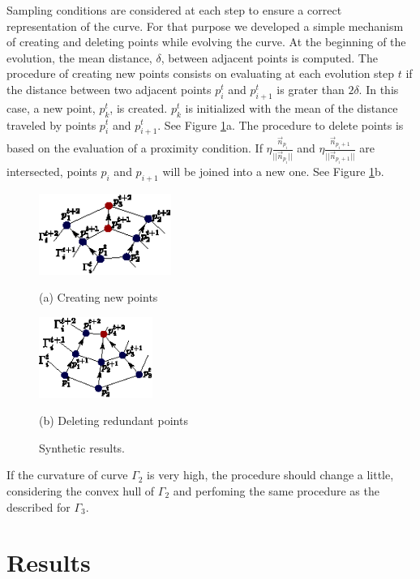 \documentclass{article}
\begin{document}
Sampling conditions are considered at each step to ensure a correct representation of the curve. For that purpose we developed a simple mechanism of creating and deleting points while evolving the curve. At the beginning of the evolution, the mean distance, $\delta$, between adjacent points is computed. The procedure of creating new points consists on evaluating at each evolution step $t$ if the distance between two adjacent points $p_i^t$ and $p_{i+1}^t$ is grater than $2\delta$. In this case, a new point, $p_k^t$, is created. $p_k^t$ is initialized with the mean of the distance traveled by points $p_i^t$ and $p_{i+1}^t$. See Figure \ref{fig:nacimiento_y_muerte}a. The procedure to delete points is based on the evaluation of a proximity condition. If $\eta\frac{\vec{n}_{p_i}}{||\vec{n}_{p_i}||}$ and $\eta\frac{\vec{n}_{p_i+1}}{||\vec{n}_{p_i+1}||}$ are intersected, points $p_i$ and $p_{i+1}$ will be joined into a new one. See Figure \ref{fig:nacimiento_y_muerte}b.
\begin{figure}[t]
\begin{minipage}[b]{.5\linewidth}
  \centering
  \centerline{\includegraphics[width=4.3cm]{pics/nacimiento}}
  \centerline{(a) Creating new points}\medskip
\end{minipage}
\hfill
\begin{minipage}[b]{.48\linewidth}
  \centering
  \centerline{\includegraphics[width=3.7cm]{pics/muerte}}
  \centerline{(b) Deleting redundant points}\medskip
\end{minipage}
\caption{Synthetic results.}
\label{fig:nacimiento_y_muerte}
\end{figure}
If the curvature of curve $\Gamma_2$ is very high, the procedure should change a little, considering the convex hull of $\Gamma_2$ and perfoming the same procedure as the described for $\Gamma_3$.

\section{Results}
\label{sec:results}
\end{document}
